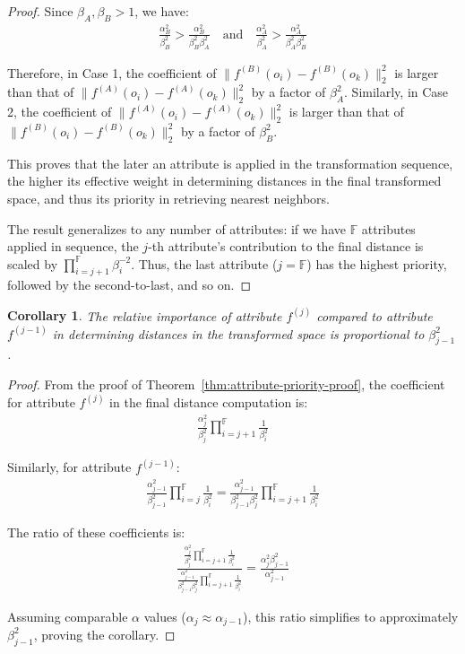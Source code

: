 \documentclass[numbers,sort]{article}
\newtheorem{corollary}{Corollary}
\begin{document}
\begin{proof}
Since $\beta_A, \beta_B > 1$, we have:
\begin{align}
\frac{\alpha_B^2}{\beta_B^2} > \frac{\alpha_B^2}{\beta_B^2 \beta_A^2} \quad \text{and} \quad \frac{\alpha_A^2}{\beta_A^2} > \frac{\alpha_A^2}{\beta_A^2 \beta_B^2}
\end{align}

Therefore, in Case 1, the coefficient of $\|f^{(B)}(o_i) - f^{(B)}(o_k)\|_2^2$ is larger than that of $\|f^{(A)}(o_i) - f^{(A)}(o_k)\|_2^2$ by a factor of $\beta_A^2$. Similarly, in Case 2, the coefficient of $\|f^{(A)}(o_i) - f^{(A)}(o_k)\|_2^2$ is larger than that of $\|f^{(B)}(o_i) - f^{(B)}(o_k)\|_2^2$ by a factor of $\beta_B^2$.

This proves that the later an attribute is applied in the transformation sequence, the higher its effective weight in determining distances in the final transformed space, and thus its priority in retrieving nearest neighbors.

The result generalizes to any number of attributes: if we have $\mathbb{F}$ attributes applied in sequence, the $j$-th attribute's contribution to the final distance is scaled by $\prod_{i=j+1}^{\mathbb{F}} \beta_i^{-2}$. Thus, the last attribute ($j = \mathbb{F}$) has the highest priority, followed by the second-to-last, and so on.
\end{proof}

\begin{corollary}
\label{cor:ratio-scaling}
The relative importance of attribute $f^{(j)}$ compared to attribute $f^{(j-1)}$ in determining distances in the transformed space is proportional to $\beta_{j-1}^2$.
\end{corollary}

\begin{proof}
From the proof of Theorem~\ref{thm:attribute-priority-proof}, the coefficient for attribute $f^{(j)}$ in the final distance computation is:
\begin{align}
\frac{\alpha_j^2}{\beta_j^2} \prod_{i=j+1}^{\mathbb{F}} \frac{1}{\beta_i^2}
\end{align}

Similarly, for attribute $f^{(j-1)}$:
\begin{align}
\frac{\alpha_{j-1}^2}{\beta_{j-1}^2} \prod_{i=j}^{\mathbb{F}} \frac{1}{\beta_i^2} = \frac{\alpha_{j-1}^2}{\beta_{j-1}^2 \beta_j^2} \prod_{i=j+1}^{\mathbb{F}} \frac{1}{\beta_i^2}
\end{align}

The ratio of these coefficients is:
\begin{align}
\frac{\frac{\alpha_j^2}{\beta_j^2} \prod_{i=j+1}^{\mathbb{F}} \frac{1}{\beta_i^2}}{\frac{\alpha_{j-1}^2}{\beta_{j-1}^2 \beta_j^2} \prod_{i=j+1}^{\mathbb{F}} \frac{1}{\beta_i^2}} = \frac{\alpha_j^2 \beta_{j-1}^2}{\alpha_{j-1}^2}
\end{align}

Assuming comparable $\alpha$ values ($\alpha_j \approx \alpha_{j-1}$), this ratio simplifies to approximately $\beta_{j-1}^2$, proving the corollary.
\end{proof}
\end{document}
